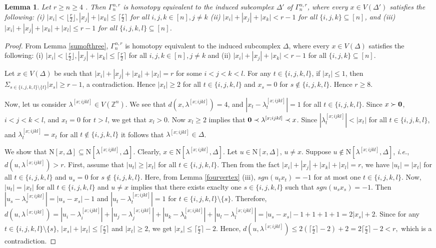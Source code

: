 \documentclass{amsart}
\newtheorem{lemma}[theorem]{Lemma}
\theoremstyle{definition}
\theoremstyle{remark}
\numberwithin{equation}{section}
\newcommand{\D}{\Delta}
\newcommand{\f}{\lfloor\frac{r}{2}\rfloor}
\newcommand{\cil}{\lceil\frac{r}{2}\rceil}
\def\Z{{\mathbb{Z}}}
\def\n{{\mathrm{N}}}
\begin{document}
\begin{lemma}\label{sumoffour}
	Let $r\geq n\geq 4$ . Then $\Gamma_n^{\alpha, r}$ is homotopy equivalent to the induced subcomplex $\Delta'$ of $\Gamma_n^{\alpha, r}$, where every $x \in V(\Delta')$ satisfies the following: (i) $|x_i|< \f, |x_j|+|x_k|\leq \cil$ for all $i, j, k \in [n], j \neq k$ (ii) $|x_i| + |x_j| + |x_k| < r-1$ for all $\{i, j, k\}\subseteq [n]$, and (iii) $|x_i| + |x_j| + |x_k| + |x_l|\leq r-1$ for all  $\{i, j, k, l\} \subseteq [n]$.
\end{lemma}

\begin{proof} From Lemma \ref{sumofthree}, $\Gamma_n^{\alpha, r}$ is homotopy equivalent to the induced subcomplex $\Delta$, where every $x \in V(\Delta)$ satisfies the following: (i) $|x_i|< \f, |x_j|+|x_k|\leq \cil$ for all $i, j, k \in [n], j \neq k$  and (ii) $|x_i| + |x_j| + |x_k| < r-1$ for all  $\{i, j, k \}\subseteq [n]$. 
	
	Let $x\in V(\D)$ be such that $|x_i| + |x_j| + |x_k| + |x_l| = r$ for some  $i< j<k<l$.  
	For any $t \in \{i, j, k, l\}$, if  $|x_t| \leq 1$, then $\Sigma_{s \in \{i, j, k, l\} \setminus \{t\}} |x_s| \geq r-1$, a contradiction. Hence $|x_t| \geq 2$ for all $t \in \{i, j, k, l\}$ and $x_s=0$ for $s \notin \{i, j, k, l\}$. Hence $r \geq 8$. 
	
	Now, let us consider $\lambda^{[x;ijkl]}\in V(\Z^n)$. We see that $d(x,\lambda^{[x;ijkl]})=4$, and $|x_t-\lambda^{[x;ijkl]}_t|=1$ for all $t\in \{i,j,k,l\}$. Since $x\succ {\bf{0}}$, $i<j<k<l$, and 
	$x_t=0$ for $t>l$, we get that $x_l>0$. Now $x_l \geq 2$ implies that   ${\bf{0}} \prec \lambda^{[x;ijkl]} \prec x$. Since $|\lambda^{[x;ijkl]}_t|<|x_t|$ for all $t\in \{i,j,k,l\}$, and $\lambda^{[x;ijkl]}_t=x_t$ for all $t\not\in \{i,j,k,l\}$ it follows that $\lambda^{[x;ijkl]} \in \D$.
	
	
	We show that $\n[x, \D] \subseteq \n[\lambda^{[x;ijkl]}, \D]$. Clearly, $x \in  \n[\lambda^{[x;ijkl]}, \D]$. Let $u \in \n[x, \D]$, $u\neq x$.  Suppose $u \notin \n[\lambda^{[x;ijkl]}, \D]$, {\it i.e.}, $d(u, \lambda^{[x;ijkl]}) > r$. First, assume that $|u_t| \geq |x_t|$ for all $t \in \{i, j, k, l\}$. Then from the fact $|x_i|+|x_j|+|x_k|+|x_l|=r$, we  have $|u_t| = |x_t|$ for all $t\in \{i,j,k,l\}$ and $u_s = 0$ for $s \notin \{i, j, k, l\}$. Here, from Lemma \ref{fourvertex} (iii), $sgn(u_tx_t)=-1$ for at most one $t \in \{i, j, k, l\}$.   Now, $|u_t| = |x_t|$ for all $t \in \{i, j, k, l\}$ and $ u \neq x$ implies that there exists exaclty one $s \in \{i, j, k, l\}$ such that  $sgn(u_sx_s) = -1$.  Then $|u_s - \lambda^{[x;ijkl]}_s| = |u_s - x_s| - 1$ and $|u_t - \lambda^{[x;ijkl]}_t| = 1$ for $t \in \{i, j, k, l\} \setminus \{s\}$. Therefore, $d(u, \lambda^{[x;ijkl]}) = |u_i - \lambda^{[x;ijkl]}_i| + |u_j - \lambda^{[x;ijkl]}_j| + |u_k - \lambda^{[x;ijkl]}_k| + |u_l - \lambda^{[x;ijkl]}_l| = |u_s - x_s| - 1 + 1 + 1 + 1 = 2|x_s| + 2.$
	Since for any $t \in \{i, j, k, l\} \setminus \{s\}$, $|x_s| + |x_t| \leq \cil$ and $|x_t| \geq 2$, we get $|x_s| \leq \cil - 2$. Hence,
	$d(u, \lambda^{[x;ijkl]}) \leq  2(\cil - 2) + 2 = 2\cil - 2 < r,$ which is a contradiction.
	

\end{proof}
\end{document}
